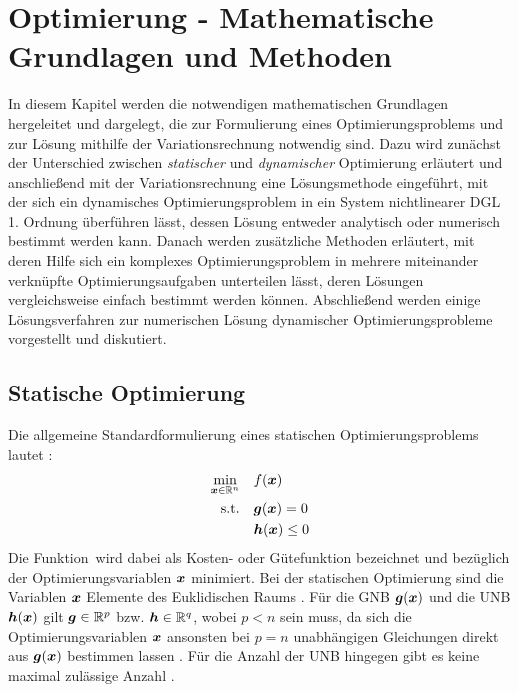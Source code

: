 \chapter{Optimierung - Mathematische Grundlagen und Methoden}\label{cha:Optimierung}
In diesem Kapitel werden die notwendigen mathematischen Grundlagen hergeleitet und dargelegt, die zur Formulierung eines Optimierungsproblems und zur Lösung mithilfe der Variationsrechnung notwendig sind. Dazu wird zunächst der Unterschied zwischen \textit{statischer} und \textit{dynamischer} Optimierung erläutert und anschließend mit der Variationsrechnung eine Lösungsmethode eingeführt, mit der sich ein dynamisches Optimierungsproblem in ein System nichtlinearer \gls{DGL} 1. Ordnung überführen lässt, dessen Lösung entweder analytisch oder numerisch bestimmt werden kann. Danach werden zusätzliche Methoden erläutert, mit deren Hilfe  sich ein komplexes Optimierungsproblem in mehrere miteinander verknüpfte Optimierungsaufgaben unterteilen lässt, deren Lösungen vergleichsweise einfach bestimmt werden können. Abschließend werden einige Lösungsverfahren zur numerischen Lösung dynamischer Optimierungsprobleme vorgestellt und diskutiert. 
\section{Statische Optimierung}\label{sec:statischeOpt}
Die allgemeine Standardformulierung eines statischen Optimierungsproblems lautet \cite{KnutGraichen.2012}:
\begin{align}
	\min_{\boldsymbol{x}\in\mathbb{R}^n} \quad &f(\boldsymbol{x}) \\
	\textrm{s.t.} \quad&\boldsymbol{g}(\boldsymbol{x}) = 0\\
	&\boldsymbol{h}(\boldsymbol{x}) \leq 0
\end{align}
Die Funktion \fofx\,wird dabei als Kosten- oder Gütefunktion bezeichnet und bezüglich der Optimierungsvariablen $\boldsymbol{x}$ minimiert. Bei der statischen Optimierung sind die Variablen $\boldsymbol{x}$ Elemente des Euklidischen Raums \cite{KnutGraichen.2012}. Für die \gls{GNB} $\boldsymbol{g}(\boldsymbol{x})$ und die \gls{UNB} $\boldsymbol{h}(\boldsymbol{x})$ gilt $\boldsymbol{g}\in\mathbb{R}^p$ bzw. $\boldsymbol{h}\in\mathbb{R}^q$, wobei $p<n$ sein muss, da sich die Optimierungsvariablen $\boldsymbol{x}$ ansonsten bei $p=n$ unabhängigen Gleichungen direkt aus $\boldsymbol{g}(\boldsymbol{x})$ bestimmen lassen \cite{Papageorgiou.2012}. Für die Anzahl der \gls{UNB} hingegen gibt es keine maximal zulässige Anzahl \cite{Papageorgiou.2012}.
